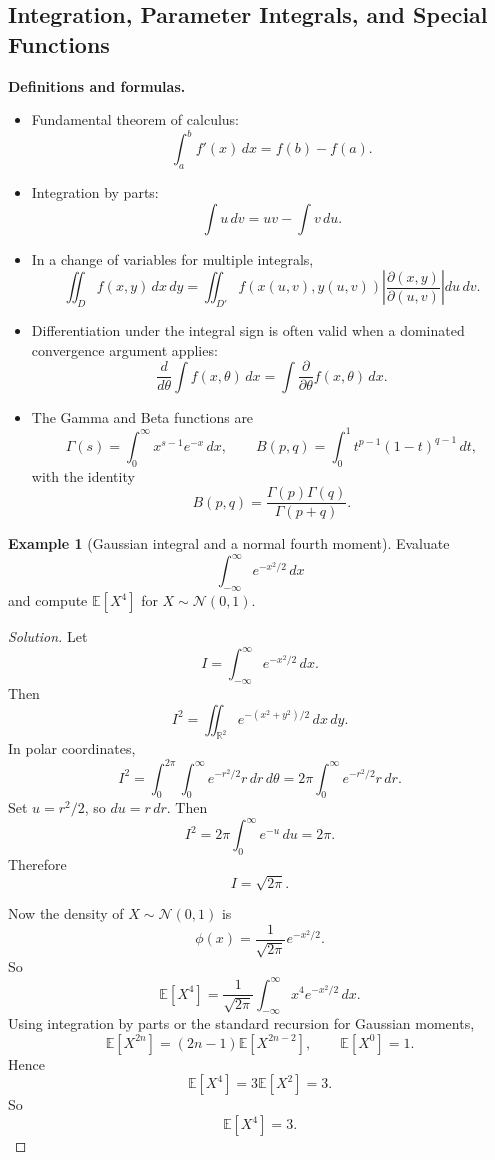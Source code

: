\documentclass[11pt]{article}
\theoremstyle{definition}
\newtheorem{example}{Example}[section]
\newcommand{\R}{\mathbb{R}}
\newcommand{\E}{\mathbb{E}}
\begin{document}
\subsection{Integration, Parameter Integrals, and Special Functions}
\textbf{Definitions and formulas.}
\begin{itemize}
    \item Fundamental theorem of calculus:
    \[
        \int_a^b f'(x)\,dx = f(b)-f(a).
    \]
    \item Integration by parts:
    \[
        \int u\,dv = uv - \int v\,du.
    \]
    \item In a change of variables for multiple integrals,
    \[
        \iint_D f(x,y)\,dx\,dy = \iint_{D'} f(x(u,v),y(u,v))\left|\frac{\partial(x,y)}{\partial(u,v)}\right|du\,dv.
    \]
    \item Differentiation under the integral sign is often valid when a dominated convergence argument applies:
    \[
        \frac{d}{d\theta}\int f(x,\theta)\,dx = \int \frac{\partial}{\partial\theta}f(x,\theta)\,dx.
    \]
    \item The Gamma and Beta functions are
    \[
        \Gamma(s)=\int_0^{\infty}x^{s-1}e^{-x}\,dx, \qquad
        B(p,q)=\int_0^1 t^{p-1}(1-t)^{q-1}\,dt,
    \]
    with the identity
    \[
        B(p,q)=\frac{\Gamma(p)\Gamma(q)}{\Gamma(p+q)}.
    \]
\end{itemize}

\begin{example}[Gaussian integral and a normal fourth moment]
Evaluate
\[
\int_{-\infty}^{\infty} e^{-x^2/2}\,dx
\]
and compute $\E[X^4]$ for $X\sim \mathcal{N}(0,1)$.
\end{example}

\begin{proof}[Solution]
Let
\[
I=\int_{-\infty}^{\infty} e^{-x^2/2}\,dx.
\]
Then
\[
I^2=\iint_{\R^2} e^{-(x^2+y^2)/2}\,dx\,dy.
\]
In polar coordinates,
\[
I^2=\int_0^{2\pi}\int_0^{\infty} e^{-r^2/2}r\,dr\,d\theta
=2\pi \int_0^{\infty} e^{-r^2/2}r\,dr.
\]
Set $u=r^2/2$, so $du=r\,dr$. Then
\[
I^2=2\pi\int_0^{\infty} e^{-u}\,du=2\pi.
\]
Therefore
\[
\boxed{I=\sqrt{2\pi}}.
\]

Now the density of $X\sim\mathcal{N}(0,1)$ is
\[
\phi(x)=\frac{1}{\sqrt{2\pi}}e^{-x^2/2}.
\]
So
\[
\E[X^4]=\frac{1}{\sqrt{2\pi}}\int_{-\infty}^{\infty}x^4 e^{-x^2/2}\,dx.
\]
Using integration by parts or the standard recursion for Gaussian moments,
\[
\E[X^{2n}] = (2n-1)\E[X^{2n-2}], \qquad \E[X^0]=1.
\]
Hence
\[
\E[X^4]=3\E[X^2]=3.
\]
So
\[
\boxed{\E[X^4]=3}.
\]
\end{proof}
\end{document}
